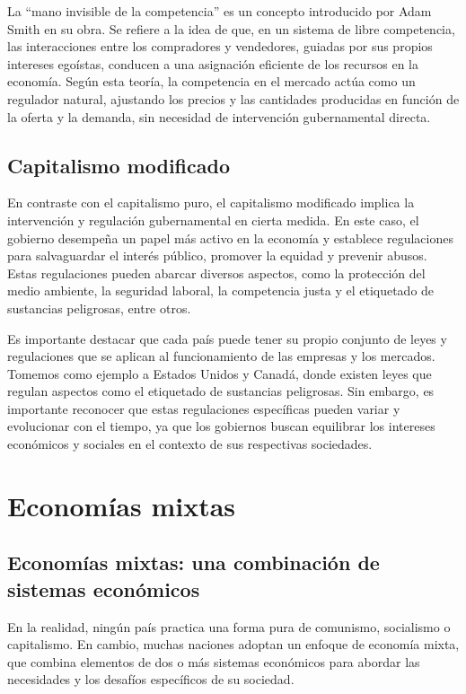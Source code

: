\documentclass[
  man,
  floatsintext,
  longtable,
  a4paper,
  nolmodern,
  notxfonts,
  notimes,
  12pt,
  colorlinks=true,linkcolor=blue,citecolor=blue,urlcolor=blue]{apa7}
\begin{document}
La ``mano invisible de la competencia'' es un concepto introducido por
Adam Smith en su obra. Se refiere a la idea de que, en un sistema de
libre competencia, las interacciones entre los compradores y vendedores,
guiadas por sus propios intereses egoístas, conducen a una asignación
eficiente de los recursos en la economía. Según esta teoría, la
competencia en el mercado actúa como un regulador natural, ajustando los
precios y las cantidades producidas en función de la oferta y la
demanda, sin necesidad de intervención gubernamental directa.

\subsection{Capitalismo modificado}\label{capitalismo-modificado}

En contraste con el capitalismo puro, el capitalismo modificado implica
la intervención y regulación gubernamental en cierta medida. En este
caso, el gobierno desempeña un papel más activo en la economía y
establece regulaciones para salvaguardar el interés público, promover la
equidad y prevenir abusos. Estas regulaciones pueden abarcar diversos
aspectos, como la protección del medio ambiente, la seguridad laboral,
la competencia justa y el etiquetado de sustancias peligrosas, entre
otros.

Es importante destacar que cada país puede tener su propio conjunto de
leyes y regulaciones que se aplican al funcionamiento de las empresas y
los mercados. Tomemos como ejemplo a Estados Unidos y Canadá, donde
existen leyes que regulan aspectos como el etiquetado de sustancias
peligrosas. Sin embargo, es importante reconocer que estas regulaciones
específicas pueden variar y evolucionar con el tiempo, ya que los
gobiernos buscan equilibrar los intereses económicos y sociales en el
contexto de sus respectivas sociedades.

\section{Economías mixtas}\label{economuxedas-mixtas}

\subsection{Economías mixtas: una combinación de sistemas
económicos}\label{economuxedas-mixtas-una-combinaciuxf3n-de-sistemas-econuxf3micos}

En la realidad, ningún país practica una forma pura de comunismo,
socialismo o capitalismo. En cambio, muchas naciones adoptan un enfoque
de economía mixta, que combina elementos de dos o más sistemas
económicos para abordar las necesidades y los desafíos específicos de su
sociedad.
\end{document}
